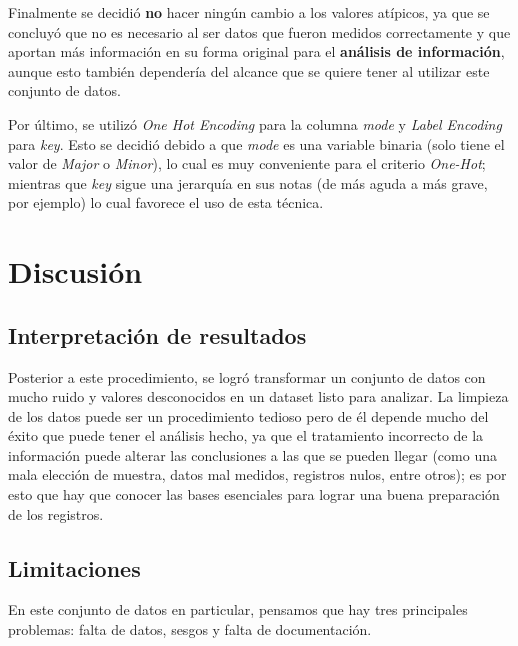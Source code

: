 \documentclass{article}
\begin{document}
	Finalmente se decidió \textbf{no} hacer ningún cambio a los valores atípicos, ya que se concluyó que no es necesario al ser datos que fueron medidos correctamente y que aportan más información en su forma original para el \textbf{análisis de información}, aunque esto también dependería del alcance que se quiere tener al utilizar este conjunto de datos.
	
	Por último, se utilizó \textit{One Hot Encoding} para la columna \textit{mode} y \textit{Label Encoding} para \textit{key}. Esto se decidió debido a que \textit{mode} es una variable binaria (solo tiene el valor de \textit{Major} o \textit{Minor}), lo cual es muy conveniente para el criterio \textit{One-Hot}; mientras que \textit{key} sigue una jerarquía en sus notas (de más aguda a más grave, por ejemplo) lo cual favorece el uso de esta técnica.
	
	\section{Discusión}
	\subsection{Interpretación de resultados}
	Posterior a este procedimiento, se logró transformar un conjunto de datos con mucho ruido y valores desconocidos en un dataset listo para analizar. La limpieza de los datos puede ser un procedimiento tedioso pero de él depende mucho del éxito que puede tener el análisis hecho, ya que el tratamiento incorrecto de la información puede alterar las conclusiones a las que se pueden llegar (como una mala elección de muestra, datos mal medidos, registros nulos, entre otros); es por esto que hay que conocer las bases esenciales para lograr una buena preparación de los registros.
	
	\subsection{Limitaciones}
	\label{subsec:limitaciones}
	En este conjunto de datos en particular, pensamos que hay tres principales problemas: falta de datos, sesgos y falta de documentación.
	
\end{document}
